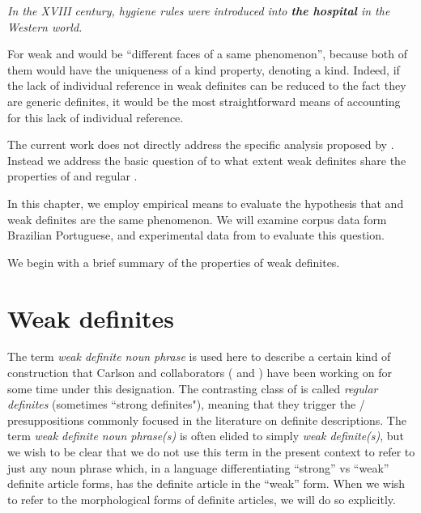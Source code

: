 \documentclass[output=paper,
modfonts
]{langscibook}
\begin{document}
\ea \label{ex:desaetal:3}
\textit{In the XVIII century, hygiene rules were introduced into \textbf{the hospital} in the Western world.}
\z 

For \citet[193]{Aguilar-GuevaraZwarsts2011} weak and  would be “different faces of a same phenomenon”, because both of them would have the uniqueness of a kind property, denoting a kind.  Indeed, if the lack of individual reference in weak definites can be reduced to the fact they are generic definites, it would be the most straightforward means of accounting for this lack of individual reference. 

The current work does not directly address the specific analysis proposed by \citet{Aguilar-GuevaraZwarsts2011}. Instead we address the basic question of to what extent weak definites share the properties of  and regular .
 
In this chapter, we employ empirical means to evaluate the hypothesis that  and weak definites are the same phenomenon. We will examine corpus data form Brazilian Portuguese, and experimental data from  to evaluate this question.

We begin with a brief summary of the properties of weak definites.


\section{Weak definites} \label{sec:desaetal:2}

The term \textit{weak definite noun phrase} is used here to describe a certain kind of construction that Carlson and collaborators (\citealt{CarlsonSussman2005,CarlsonEtAlii2006,CarlsonEtAlii2013} and \citealt{KleinEtAlii2013})
have been working on for some time under this designation. The contrasting class of  is called \textit{regular definites} (sometimes “strong definites"), meaning that they trigger the / presuppositions commonly focused in the literature on definite descriptions. The term \textit{weak definite noun phrase(s)} is often elided to simply \textit{weak definite(s)}, but we wish to be clear that we do not use this term in the present context to refer to just any noun phrase which, in a language differentiating “strong” vs “weak” definite article forms, has the definite article in the “weak” form.  When we wish to refer to the morphological forms of definite articles, we will do so explicitly.
\end{document}

